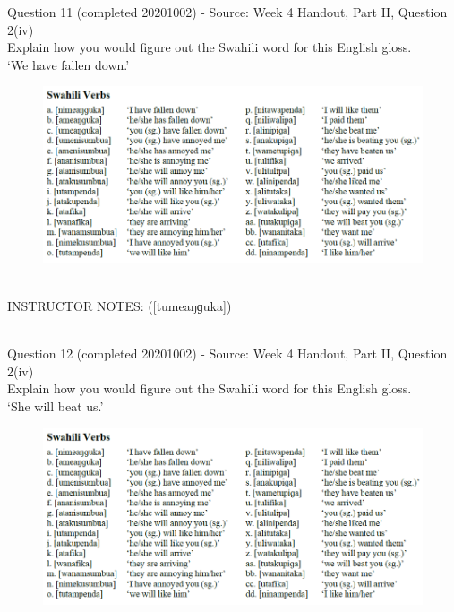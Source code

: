 \documentclass[12pt]{article}
\begin{document}
{\large Question 11} (completed 20201002) - Source: Week 4 Handout, Part II, Question 2(iv)\\

Explain how you would figure out the Swahili word for this English gloss.\\

‘We have fallen down.’

\begin{figure}[H]
\includegraphics{../images/swahiliverbs.png}
\end{figure}

~\\
INSTRUCTOR NOTES: ([tumeaŋɡuka])


~\\

{\large Question 12} (completed 20201002) - Source: Week 4 Handout, Part II, Question 2(iv)\\

Explain how you would figure out the Swahili word for this English gloss.\\

‘She will beat us.’

\begin{figure}[H]
\includegraphics{../images/swahiliverbs.png}
\end{figure}
\end{document}
